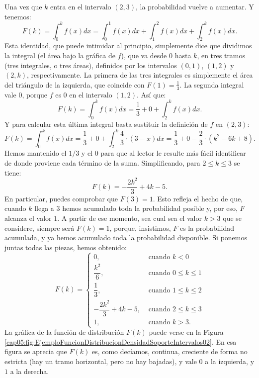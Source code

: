 \begin{ejemplo}
Una vez que $k$ entra en el intervalo $(2,3)$, la probabilidad vuelve a aumentar. Y tenemos:
\[F(k)=\int_0^k f(x)dx=\int_0^1 f(x)dx + \int_1^2 f(x)dx+ \int_2^k f(x)dx.\]
Esta identidad, que puede intimidar al principio, simplemente dice que dividimos la integral (el área bajo la gráfica de $f$), que va desde $0$ hasta $k$,  en tres tramos (tres integrales, o tres áreas), definidos por los intervalos $(0,1)$, $(1,2)$ y $(2,k)$, respectivamente. La primera de las tres integrales es simplemente el área del triángulo de la izquierda, que coincide con $F(1)=\frac{1}{3}$. La segunda integral vale $0$, porque $f$ es $0$ en el intervalo $(1,2)$. Así que:
\[F(k)=\int_0^k f(x)dx=\frac{1}{3} + 0 + \int_2^k f(x)dx.\]
Y para calcular esta última integral basta sustituir la definición de $f$ en $(2,3)$:
\[F(k)=\int_0^k f(x)dx=\frac{1}{3} + 0 + \int_2^k \dfrac{4}{3}\cdot(3-x)dx=
\frac{1}{3} +0-\frac{2}{3}\cdot(k^2-6 k+8).\]
Hemos mantenido el $1/3$ y el $0$ para que al lector le resulte más fácil identificar de donde proviene cada término de la suma. Simplificando, para $2\leq k\leq 3$ se tiene:
\[F(k)=-\dfrac{2 k^2}{3}+4 k-5.\]
En particular, puedes comprobar que $F(3)=1$. Esto refleja el hecho de que, cuando $k$ llega a $3$
hemos acumulado toda la probabilidad posible y, por eso, $F$ alcanza el valor $1$. A partir de ese
momento, sea cual sea el valor $k>3$ que se considere, siempre será $F(k)=1$, porque, insistimos,
$F$ es la probabilidad acumulada, y ya hemos acumulado toda la probabilidad disponible. Si ponemos
juntas todas las piezas, hemos obtenido:
\[F(k)=
\begin{cases}
0,&\mbox{ cuando } k<0\\[3mm]
\dfrac{k^2}{6},&\mbox{ cuando }0\leq k\leq 1\\[3mm]
\dfrac{1}{3},&\mbox{ cuando }1\leq k\leq 2\\[3mm]
-\dfrac{2 k^2}{3}+4 k-5,&\mbox{ cuando }2\leq k\leq 3\\[3mm]
1,&\mbox{ cuando }k>3.
\end{cases}\]
La gráfica de la función de distribución $F(k)$ puede verse en la Figura
\ref{cap05:fig:EjemploFuncionDistribucionDensidadSoporteIntervalos02}. En esa figura se aprecia que
$F(k)$ es, como decíamos, continua, creciente de forma no estricta (hay un tramo horizontal, pero
no hay bajadas), y vale $0$ a la izquierda, y $1$ a la derecha.


\end{ejemplo}
